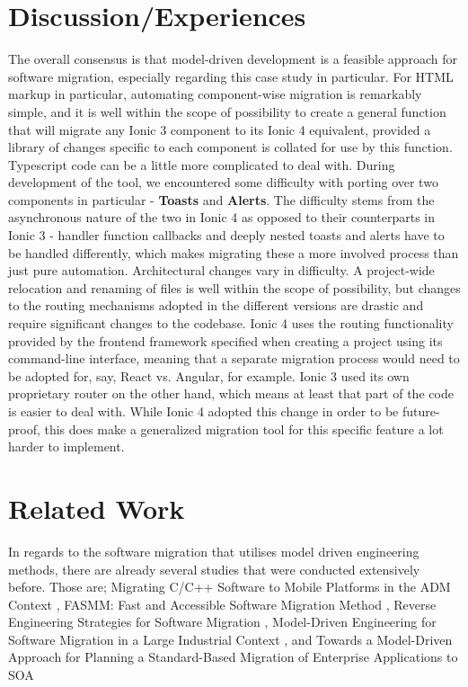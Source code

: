 \documentclass[conference]{IEEEtran}
\begin{document}
\section{Discussion/Experiences}
The overall consensus is that model-driven development is a feasible approach
for software migration, especially regarding this case study in particular.
\newline \newline
For HTML markup in particular, automating component-wise migration is remarkably simple, and it
is well within the scope of possibility to create a general function that will migrate any Ionic
3 component to its Ionic 4 equivalent, provided a library of changes specific to each component
is collated for use by this function.
\newline \newline
Typescript code can be a little more complicated to deal with. During development of the tool,
we encountered some difficulty with porting over two components in particular - \textbf{Toasts} and
\textbf{Alerts}. The difficulty stems from the asynchronous nature of the two in Ionic 4 as opposed to their
counterparts in Ionic 3 - handler function callbacks and deeply nested toasts and alerts have to be handled differently,
which makes migrating these a more involved process than just pure automation.
\newline \newline
Architectural changes vary in difficulty. A project-wide relocation and renaming of files is well within the
scope of possibility, but changes to the routing mechanisms adopted in the different versions are drastic and
require significant changes to the codebase. Ionic 4 uses the routing functionality provided by the frontend framework
specified when creating a project using its command-line interface, meaning that a separate migration process would need
to be adopted for, say, React vs. Angular, for example. Ionic 3 used its own proprietary router on the other hand, which means
at least that part of the code is easier to deal with. While Ionic 4 adopted this change in order to be future-proof, this does
make a generalized migration tool for this specific feature a lot harder to implement.

\section{Related Work}
In regards to the software migration that utilises model driven engineering methods,
there are already several studies that were conducted extensively before.
Those are; Migrating C/C++ Software to Mobile Platforms in the ADM Context \cite{b2},
FASMM: Fast and Accessible Software Migration Method \cite{b3}, Reverse Engineering 
Strategies for Software Migration \cite{b4}, Model-Driven Engineering 
for Software Migration in a Large Industrial Context \cite{b5}, and
Towards a Model-Driven Approach for Planning a 
Standard-Based Migration of Enterprise Applications to SOA \cite{b6}
\end{document}
